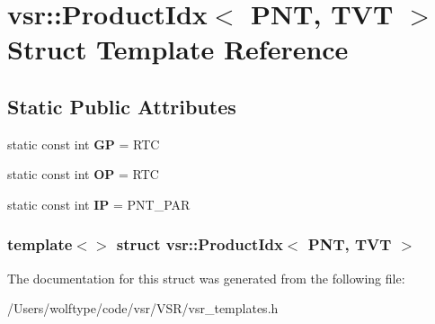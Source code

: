 \hypertarget{structvsr_1_1_product_idx_3_01_p_n_t_00_01_t_v_t_01_4}{\section{vsr\-:\-:Product\-Idx$<$ P\-N\-T, T\-V\-T $>$ Struct Template Reference}
\label{structvsr_1_1_product_idx_3_01_p_n_t_00_01_t_v_t_01_4}
}
\subsection*{Static Public Attributes}
\begin{DoxyCompactItemize}
\item 
\hypertarget{structvsr_1_1_product_idx_3_01_p_n_t_00_01_t_v_t_01_4_abcb492a734449de17755bb4a9ae9d2a0}{static const int {\bfseries G\-P} = R\-T\-C}\label{structvsr_1_1_product_idx_3_01_p_n_t_00_01_t_v_t_01_4_abcb492a734449de17755bb4a9ae9d2a0}

\item 
\hypertarget{structvsr_1_1_product_idx_3_01_p_n_t_00_01_t_v_t_01_4_a072b67551d5ad589f4056284cc015318}{static const int {\bfseries O\-P} = R\-T\-C}\label{structvsr_1_1_product_idx_3_01_p_n_t_00_01_t_v_t_01_4_a072b67551d5ad589f4056284cc015318}

\item 
\hypertarget{structvsr_1_1_product_idx_3_01_p_n_t_00_01_t_v_t_01_4_a6af6cee34a99454ca16fafc44102550f}{static const int {\bfseries I\-P} = P\-N\-T\-\_\-\-P\-A\-R}\label{structvsr_1_1_product_idx_3_01_p_n_t_00_01_t_v_t_01_4_a6af6cee34a99454ca16fafc44102550f}

\end{DoxyCompactItemize}
\subsubsection*{template$<$$>$ struct vsr\-::\-Product\-Idx$<$ P\-N\-T, T\-V\-T $>$}



The documentation for this struct was generated from the following file\-:\begin{DoxyCompactItemize}
\item 
/\-Users/wolftype/code/vsr/\-V\-S\-R/vsr\-\_\-templates.\-h\end{DoxyCompactItemize}

